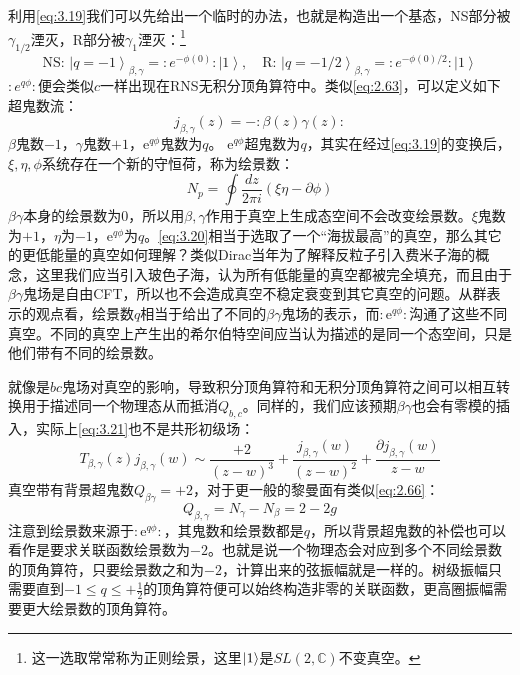 利用\ref{eq:3.19}我们可以先给出一个临时的办法，也就是构造出一个基态，NS部分被$\gamma_{1/2}$湮灭，R部分被$\gamma_1$湮灭：\footnote{这一选取常常称为正则绘景，这里$\ket{1}$是$SL(2,\mathbb{C})$不变真空。}
\begin{equation}
	\label{eq:3.20}
	\text{NS: }\left|q=-1\right\rangle_{\beta,\gamma}=:e^{-\phi(0)}:\left|1\right\rangle,\quad \text{R: }\left|q=-1/2\right\rangle_{\beta,\gamma}=:e^{-\phi(0)/2}:\left|1\right\rangle
\end{equation}
$:e^{q\phi}:$便会类似$c$一样出现在RNS无积分顶角算符中。类似\ref{eq:2.63}，可以定义如下超鬼数流：
\begin{equation}
	\label{eq:3.21}
	j_{\beta,\gamma}(z)=-:\beta(z)\gamma(z):
\end{equation}
$\beta$鬼数$-1$，$\gamma$鬼数$+1$，$\mathrm{e}^{q\phi}$鬼数为$q$。
$\mathrm{e}^{q\phi}$超鬼数为$q$，其实在经过\ref{eq:3.19}的变换后，$\xi,\eta,\phi$系统存在一个新的守恒荷，称为绘景数：
\begin{equation}
	N_p=\oint\frac{dz}{2\pi i}(\xi\eta-\partial\phi)
\end{equation}
$\beta\gamma$本身的绘景数为$0$，所以用$\beta,\gamma$作用于真空上生成态空间不会改变绘景数。$\xi$鬼数为$+1$，$\eta$为$-1$，$\mathrm{e}^{q\phi}$为$q$。\ref{eq:3.20}相当于选取了一个“海拔最高”的真空，那么其它的更低能量的真空如何理解？类似Dirac当年为了解释反粒子引入费米子海的概念，这里我们应当引入玻色子海，认为所有低能量的真空都被完全填充，而且由于$\beta\gamma$鬼场是自由CFT，所以也不会造成真空不稳定衰变到其它真空的问题。从群表示的观点看，绘景数$q$相当于给出了不同的$\beta\gamma$鬼场的表示，而$:\mathrm{e}^{q\phi}:$沟通了这些不同真空。不同的真空上产生出的希尔伯特空间应当认为描述的是同一个态空间，只是他们带有不同的绘景数。

就像是$bc$鬼场对真空的影响，导致积分顶角算符和无积分顶角算符之间可以相互转换用于描述同一个物理态从而抵消$Q_{b,c}$。同样的，我们应该预期$\beta\gamma$也会有零模的插入，实际上\ref{eq:3.21}也不是共形初级场：
\begin{equation}
	T_{\beta,\gamma}(z)j_{\beta,\gamma}(w)\sim\frac{+2}{(z-w)^3}+\frac{j_{\beta,\gamma}(w)}{(z-w)^2}+\frac{\partial j_{\beta,\gamma}(w)}{z-w}
\end{equation}
真空带有背景超鬼数$Q_{\beta\gamma}=+2$，对于更一般的黎曼面有类似\ref{eq:2.66}：
\begin{equation}
	Q_{\beta,\gamma} = N_{\gamma}-N_{\beta}=2-2g
\end{equation}
注意到绘景数来源于$:\mathrm{e}^{q\phi}:$，其鬼数和绘景数都是$q$，所以背景超鬼数的补偿也可以看作是要求关联函数绘景数为$-2$。也就是说一个物理态会对应到多个不同绘景数的顶角算符，只要绘景数之和为$-2$，计算出来的弦振幅就是一样的。树级振幅只需要直到$-1\leq q\leq+\frac{1}{2}$的顶角算符便可以始终构造非零的关联函数，更高圈振幅需要更大绘景数的顶角算符。
